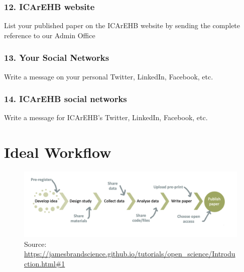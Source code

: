 \documentclass[
  letterpaper,
  DIV=11,
  numbers=noendperiod]{scrreprt}
\begin{document}

\hypertarget{icarehb-website}{%
\subsubsection*{12. ICArEHB website}\label{icarehb-website}}

List your published paper on the ICArEHB website by sending the complete
reference to our Admin Office

\hypertarget{your-social-networks}{%
\subsubsection*{13. Your Social Networks}\label{your-social-networks}}

Write a message on your personal Twitter, LinkedIn, Facebook, etc.

\hypertarget{icarehb-social-networks}{%
\subsubsection*{14. ICArEHB social
networks}\label{icarehb-social-networks}}

Write a message for ICArEHB's Twitter, LinkedIn, Facebook, etc.

\hypertarget{ideal-workflow}{%
\section*{Ideal Workflow}\label{ideal-workflow}}


\begin{figure}

{\centering \includegraphics{workflow.png}

}

\caption{Source:
\url{https://jamesbrandscience.github.io/tutorials/open_science/Introduction.html\#1}}

\end{figure}
\end{document}

